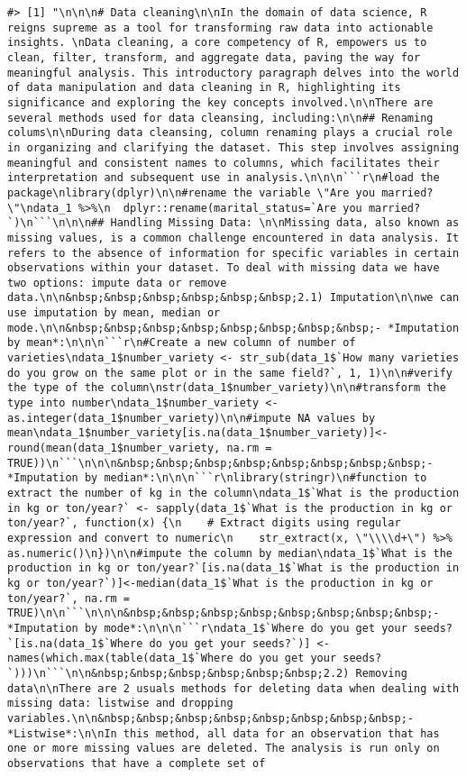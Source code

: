 \documentclass[
]{book}
\begin{document}
\begin{verbatim}
#> [1] "\n\n\n# Data cleaning\n\nIn the domain of data science, R reigns supreme as a tool for transforming raw data into actionable insights. \nData cleaning, a core competency of R, empowers us to clean, filter, transform, and aggregate data, paving the way for meaningful analysis. This introductory paragraph delves into the world of data manipulation and data cleaning in R, highlighting its significance and exploring the key concepts involved.\n\nThere are several methods used for data cleansing, including:\n\n## Renaming colums\n\nDuring data cleansing, column renaming plays a crucial role in organizing and clarifying the dataset. This step involves assigning meaningful and consistent names to columns, which facilitates their interpretation and subsequent use in analysis.\n\n\n```r\n#load the package\nlibrary(dplyr)\n\n#rename the variable \"Are you married?\"\ndata_1 %>%\n  dplyr::rename(marital_status=`Are you married?`)\n```\n\n\n## Handling Missing Data: \n\nMissing data, also known as missing values, is a common challenge encountered in data analysis. It refers to the absence of information for specific variables in certain observations within your dataset. To deal with missing data we have two options: impute data or remove data.\n\n&nbsp;&nbsp;&nbsp;&nbsp;&nbsp;&nbsp;2.1) Imputation\n\nwe can use imputation by mean, median or mode.\n\n&nbsp;&nbsp;&nbsp;&nbsp;&nbsp;&nbsp;&nbsp;&nbsp;- *Imputation by mean*:\n\n\n```r\n#Create a new column of number of varieties\ndata_1$number_variety <- str_sub(data_1$`How many varieties do you grow on the same plot or in the same field?`, 1, 1)\n\n#verify the type of the column\nstr(data_1$number_variety)\n\n#transform the type into number\ndata_1$number_variety <- as.integer(data_1$number_variety)\n\n#impute NA values by mean\ndata_1$number_variety[is.na(data_1$number_variety)]<-round(mean(data_1$number_variety, na.rm = TRUE))\n```\n\n\n&nbsp;&nbsp;&nbsp;&nbsp;&nbsp;&nbsp;&nbsp;&nbsp;- *Imputation by median*:\n\n\n```r\nlibrary(stringr)\n#function to extract the number of kg in the column\ndata_1$`What is the production in kg or ton/year?` <- sapply(data_1$`What is the production in kg or ton/year?`, function(x) {\n    # Extract digits using regular expression and convert to numeric\n    str_extract(x, \"\\\\d+\") %>% as.numeric()\n})\n\n#impute the column by median\ndata_1$`What is the production in kg or ton/year?`[is.na(data_1$`What is the production in kg or ton/year?`)]<-median(data_1$`What is the production in kg or ton/year?`, na.rm = TRUE)\n\n```\n\n\n&nbsp;&nbsp;&nbsp;&nbsp;&nbsp;&nbsp;&nbsp;&nbsp;- *Imputation by mode*:\n\n\n```r\ndata_1$`Where do you get your seeds?`[is.na(data_1$`Where do you get your seeds?`)] <- names(which.max(table(data_1$`Where do you get your seeds?`)))\n```\n\n&nbsp;&nbsp;&nbsp;&nbsp;&nbsp;&nbsp;2.2) Removing data\n\nThere are 2 usuals methods for deleting data when dealing with missing data: listwise and dropping variables.\n\n&nbsp;&nbsp;&nbsp;&nbsp;&nbsp;&nbsp;&nbsp;&nbsp;- *Listwise*:\n\nIn this method, all data for an observation that has one or more missing values are deleted. The analysis is run only on observations that have a complete set of 
\end{verbatim}
\end{document}
